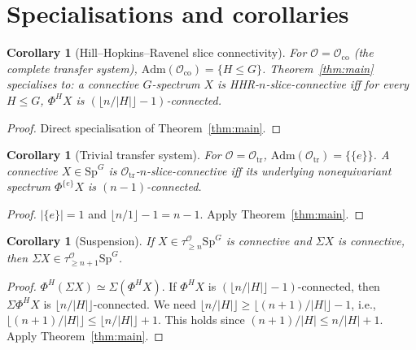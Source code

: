 \documentclass[12pt]{article}
\newtheorem{corollary}[theorem]{Corollary}
\theoremstyle{definition}
\newcommand{\SpG}{\mathrm{Sp}^{G}}
\newcommand{\PhiH}{\Phi^{H}}
\newcommand{\OO}{\mathcal{O}}
\newcommand{\admis}{\mathrm{Adm}}
\begin{document}
\section{Specialisations and corollaries}\label{sec:cor}

\begin{corollary}[Hill--Hopkins--Ravenel slice connectivity]\label{cor:HHR}
For $\OO=\OO_{\mathrm{co}}$ (the complete transfer system),
$\admis(\OO_{\mathrm{co}})=\{H\leq G\}$. Theorem~\ref{thm:main} specialises
to: a connective $G$-spectrum $X$ is HHR-$n$-slice-connective iff for every
$H\leq G$, $\PhiH X$ is $(\lfloor n/|H|\rfloor-1)$-connected.
\end{corollary}

\begin{proof}
Direct specialisation of Theorem~\ref{thm:main}.
\end{proof}

\begin{corollary}[Trivial transfer system]\label{cor:triv}
For $\OO=\OO_{\mathrm{tr}}$, $\admis(\OO_{\mathrm{tr}})=\{\{e\}\}$. A connective
$X\in\SpG$ is $\OO_{\mathrm{tr}}$-$n$-slice-connective iff its underlying
nonequivariant spectrum $\Phi^{\{e\}}X$ is $(n-1)$-connected.
\end{corollary}

\begin{proof}
$|\{e\}|=1$ and $\lfloor n/1\rfloor-1=n-1$. Apply Theorem~\ref{thm:main}.
\end{proof}

\begin{corollary}[Suspension]\label{cor:susp}
If $X\in\tau_{\geq n}^{\OO}\SpG$ is connective and $\Sigma X$ is connective,
then $\Sigma X\in\tau_{\geq n+1}^{\OO}\SpG$.
\end{corollary}

\begin{proof}
$\PhiH(\Sigma X)\simeq\Sigma(\PhiH X)$. If $\PhiH X$ is
$(\lfloor n/|H|\rfloor-1)$-connected, then $\Sigma\PhiH X$ is
$\lfloor n/|H|\rfloor$-connected. We need $\lfloor n/|H|\rfloor\geq
\lfloor (n+1)/|H|\rfloor-1$, i.e., $\lfloor (n+1)/|H|\rfloor\leq
\lfloor n/|H|\rfloor+1$. This holds since
$(n+1)/|H|\leq n/|H|+1$. Apply Theorem~\ref{thm:main}.
\end{proof}
\end{document}
